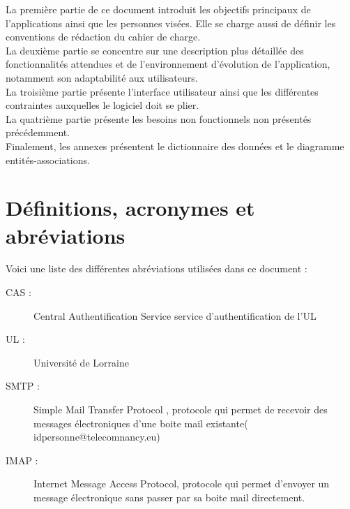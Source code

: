 \documentclass{scrreprt}
\begin{document}
\hspace{0.7cm}La première partie de ce document introduit les objectifs principaux de l'applications ainsi que les personnes visées. Elle se charge aussi de définir les conventions de rédaction du cahier de charge.\\

\hspace{0.7cm}La deuxième partie se concentre sur une description plus détaillée des fonctionnalités attendues et de l'environnement d'évolution de l'application, notamment son adaptabilité aux utilisateurs.\\

\hspace{0.7cm}La troisième partie présente l'interface utilisateur ainsi que les différentes contraintes auxquelles le logiciel doit se plier.\\

\hspace{0.7cm}La quatrième partie présente les besoins non fonctionnels non présentés précédemment.\\

\hspace{0.7cm}Finalement, les annexes présentent le dictionnaire des données et le diagramme entités-associations.

\section{Définitions, acronymes et abréviations}
\hspace{1cm}Voici une liste des différentes abréviations utilisées dans ce document :
\begin{description}
\item[CAS :] Central Authentification Service service d'authentification de l'UL
\item[UL :] Université de Lorraine
\item[SMTP :] Simple Mail Transfer Protocol , protocole qui permet de recevoir des messages électroniques d'une boite mail existante( idpersonne@telecomnancy.eu)
\item[IMAP :] Internet Message Access Protocol, protocole qui permet d'envoyer un message électronique sans passer par sa boite mail directement.


\end{description}
\end{document}
